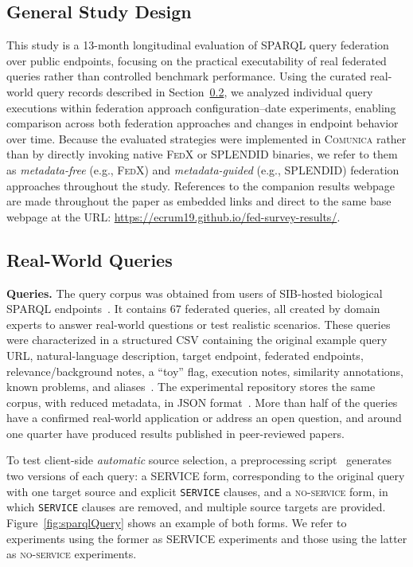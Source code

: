 \documentclass[runningheads]{llncs}
\begin{document}
\subsection{General Study Design}\label{sec4.1}
This study is a 13-month longitudinal evaluation of SPARQL query federation over public endpoints, focusing on the practical executability of real federated queries rather than controlled benchmark performance. 
Using the curated real-world query records described in Section~\ref{sec4.2}, we analyzed individual query executions within federation approach configuration--date experiments, enabling comparison across both federation approaches and changes in endpoint behavior over time. 
Because the evaluated strategies were implemented in \textsc{Comunica} rather than by directly invoking native \textsc{FedX} or \textsc{SPLENDID} binaries, we refer to them as \textit{metadata-free} (e.g., \textsc{FedX}) and \textit{metadata-guided} (e.g., \textsc{SPLENDID}) federation approaches throughout the study.
References to the companion results webpage are made throughout the paper as embedded links and direct to the same base webpage at the URL: \url{https://ecrum19.github.io/fed-survey-results/}.

\subsection{Real-World Queries}\label{sec4.2}
\textbf{Queries.}
The query corpus was obtained from users of SIB-hosted biological SPARQL endpoints~\cite{Bolleman2025sibqueries}. 
It contains 67 federated queries, all created by domain experts to answer real-world questions or test realistic scenarios. 
These queries were characterized in a structured CSV containing the original example query URL, natural-language description, target endpoint, federated endpoints, relevance/background notes, a ``toy'' flag, execution notes, similarity annotations, known problems, and aliases~\cite{fedSurveyResultsRepo}. 
The experimental repository stores the same corpus, with reduced metadata, in JSON format~\cite{fedSparqlSurveyExperimentsRepo}. 
More than half of the queries have a confirmed real-world application or address an open question, and around one quarter have produced results published in peer-reviewed papers.

To test client-side \textit{automatic} source selection, a preprocessing script~\cite{fedSparqlSurveyExperimentsRepo} generates two versions of each query: a \textsc{SERVICE} form, corresponding to the original query with one target source and explicit \texttt{SERVICE} clauses, and a \textsc{no-service} form, in which \texttt{SERVICE} clauses are removed, and multiple source targets are provided. 
Figure~\ref{fig:sparqlQuery} shows an example of both forms. 
We refer to experiments using the former as \textsc{SERVICE} experiments and those using the latter as \textsc{no-service} experiments.
\end{document}
